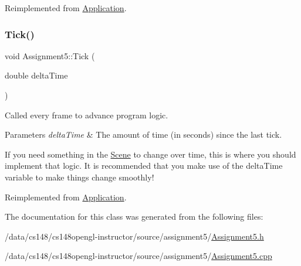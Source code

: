 Reimplemented from \hyperlink{class_application_aa8e8017ef8dd86293c96d0645e66d440}{Application}.

\hypertarget{class_assignment5_a34cdf7bc962c3a0e3959c77a24c54d79}{}\label{class_assignment5_a34cdf7bc962c3a0e3959c77a24c54d79} 
\subsubsection{\texorpdfstring{Tick()}{Tick()}}
{\footnotesize\ttfamily void Assignment5\+::\+Tick (\begin{DoxyParamCaption}\item[{double}]{delta\+Time }\end{DoxyParamCaption})\hspace{0.3cm}{\ttfamily [virtual]}}



Called every frame to advance program logic. 


\begin{DoxyParams}{Parameters}
{\em delta\+Time} & The amount of time (in seconds) since the last tick.\\
\hline
\end{DoxyParams}
If you need something in the \hyperlink{class_scene}{Scene} to change over time, this is where you should implement that logic. It is recommended that you make use of the delta\+Time variable to make things change smoothly! 

Reimplemented from \hyperlink{class_application_a0800afd5651153d31fa775a8048d14dd}{Application}.



The documentation for this class was generated from the following files\+:\begin{DoxyCompactItemize}
\item 
/data/cs148/cs148opengl-\/instructor/source/assignment5/\hyperlink{_assignment5_8h}{Assignment5.\+h}\item 
/data/cs148/cs148opengl-\/instructor/source/assignment5/\hyperlink{_assignment5_8cpp}{Assignment5.\+cpp}\end{DoxyCompactItemize}

